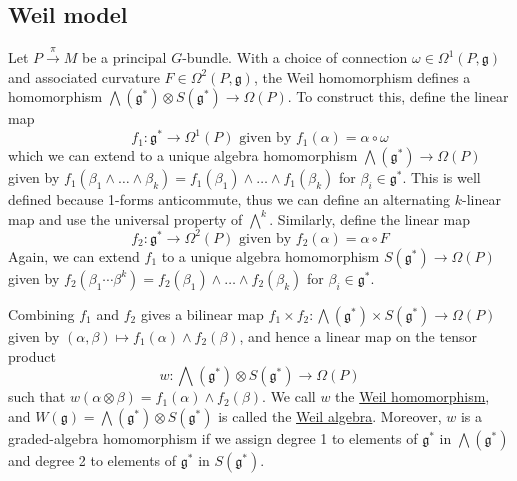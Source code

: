 \subsection{Weil model}
Let $P\xrightarrow{\pi} M$ be a principal  $G$-bundle. With a choice of
connection  $\omega\in\Omega^1(P,\mathfrak{g})$ and associated curvature
$F\in\Omega^2(P,\mathfrak{g})$,
the Weil homomorphism defines a homomorphism $\bigwedge(\mathfrak{g}^*)\otimes
S(\mathfrak{g}^*) \to \Omega(P)$. To construct this, define the linear map 
\[
	f_1 : \mathfrak{g}^* \to \Omega^1(P) \text{ given by }
	f_1(\alpha) = \alpha \circ \omega
\] 
which we can extend to a unique algebra homomorphism 
$\bigwedge(\mathfrak{g}^*)\to\Omega(P)$ given by $f_1(\beta_1\wedge\ldots\wedge \beta_k)
= f_1(\beta_1)\wedge\ldots\wedge f_1(\beta_k)$ for $\beta_i\in\mathfrak{g}^*$.
This is well defined because 1-forms anticommute, thus we can define an
alternating $k$-linear map and use the universal property of  $\bigwedge^k$.
Similarly, define the linear map 
\[
	f_2 : \mathfrak{g}^* \to \Omega^2(P) \text{ given by }
	f_2(\alpha) = \alpha \circ F
\]
Again, we can extend $f_1$ to a unique algebra homomorphism 
$S(\mathfrak{g}^*)\to \Omega(P)$ given by
$f_2(\beta_1\cdots\beta^k)=f_2(\beta_1)\wedge\ldots\wedge f_2(\beta_k)$ for
$\beta_i\in\mathfrak{g}^*$. 

Combining $f_1$ and $f_2$ gives a bilinear map $f_1\times f_2 :
\bigwedge(\mathfrak{g}^*)\times S(\mathfrak{g}^*) \to \Omega(P)$ given by
$(\alpha,\beta)\mapsto f_1(\alpha)\wedge f_2(\beta)$, and hence a linear 
map on the tensor product
\[
w : \bigwedge(\mathfrak{g}^*)\otimes S(\mathfrak{g}^*) \to \Omega(P)
\] 
such that $w(\alpha\otimes \beta) = f_1(\alpha)\wedge f_2(\beta)$.
We call $w$ the \underline{Weil homomorphism}, and 
$W(\mathfrak{g}) =\bigwedge(\mathfrak{g}^*)\otimes S(\mathfrak{g}^*)$
is called the \underline{Weil algebra}.
Moreover, $w$ is a graded-algebra homomorphism if we assign degree 1 to elements of
$\mathfrak{g}^*$ in $\bigwedge(\mathfrak{g}^*)$ and degree 2 to 
elements of $\mathfrak{g}^*$ in $S(\mathfrak{g}^*)$.


